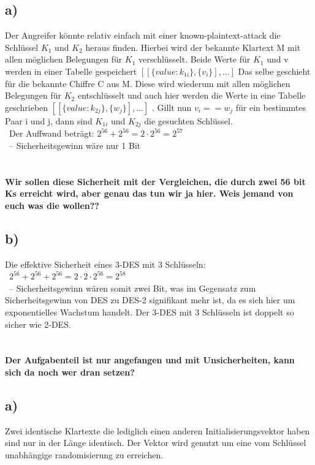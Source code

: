 \documentclass[ngerman]{fbi-aufgabenblatt}
\begin{document}
	\setcounter{section}{0}

	
	\subsection*{a)}
	Der Angreifer könnte relativ einfach mit einer known-plaintext-attack die Schlüssel $K_{1}$ und $K_{2}$ heraus finden.
	Hierbei wird der bekannte Klartext M mit allen möglichen Belegungen für $K_{1}$ verschlüsselt. Beide Werte für $K_{1}$ und v werden in einer Tabelle gespeichert $[[\{value: k_{1i}\} ,\{v_{i}\}], ... ]$ Das selbe geschieht für die bekannte Chiffre C aus M. Diese wird wiederum mit allen möglichen Belegungen für $K_{2}$ entschlüsselt und auch hier werden die Werte in eine Tabelle geschrieben $[[\{value: k_{2j}\} ,\{w_{j}\}], ... ]$ . Gillt nun $v_{i} == w_{j}$ für ein bestimmtes Paar i und j, dann sind $K_{1i}$ und $K_{2j}$ die gesuchten Schlüssel.\\\
	Der Auffwand beträgt:
	$2^{56}+2^{56} =2\cdot 2^{56} =2^{57}$\\\
	–  Sicherheitsgewinn wäre nur 1 Bit
	\\\\\\
	 \textbf{Wir sollen diese Sicherheit mit der Vergleichen, die durch zwei 56 bit Ks erreicht wird, aber genau das tun wir ja hier. Weis jemand von euch was die wollen??}
		
	\subsection*{b)}
	Die effektive Sicherheit eines 3-DES mit 3 Schlüsseln:\\\
	$2^{56}+2^{56}+2^{56} =2\cdot 2\cdot 2^{56} =2^{58}$\\\
	–  Sicherheitsgewinn wären somit zwei Bit, was im Gegensatz zum Sicherheitsgewinn von DES zu DES-2 signifikant mehr ist, da es sich hier um exponentielles Wachstum handelt. Der 3-DES mit 3 Schlüsseln ist doppelt so sicher wie
	 2-DES.
	 	\\\\\\
	 \textbf{Der Aufgabenteil ist nur angefangen und mit Unsicherheiten, kann sich da noch wer dran setzen?}
		
    
	\aufgabe{Cipher-Block-Chaining-Modus}
	
	\subsection*{a)}
	Zwei identische Klartexte die lediglich einen anderen Initialisierungsvektor haben sind nur in der Länge identisch.
	Der Vektor wird genutzt um eine vom Schlüssel unabhängige randomisierung zu erreichen.
	
\end{document}
